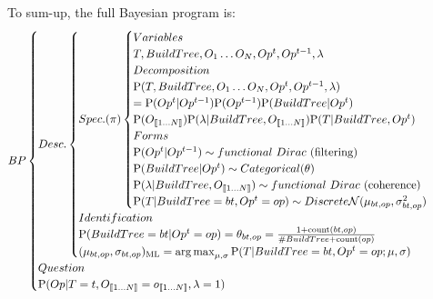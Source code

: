 To sum-up, the full Bayesian program is:
\begin{eqnarray*}
BP
\begin{cases}
Desc.
    \begin{cases}
    Spec. (\pi)
        \begin{cases}
        Variables\\
    T, BuildTree, O_1 \dots O_N, Op^t, Op^{t-1}, \lambda \\ 
        Decomposition\\
            \mathrm{P}(T, BuildTree, O_1 \dots O_N, Op^t, Op^{t-1}, \lambda) \\ 
        =   \mathrm{P}(Op^t | Op^{t-1}) \mathrm{P}(Op^{t-1}) \mathrm{P}(BuildTree | Op^t) \\
            \mathrm{P}(O_{\llbracket 1 \dots N\rrbracket}) \mathrm{P}(\lambda | BuildTree, O_{\llbracket 1 \dots N\rrbracket}) \mathrm{P}(T | BuildTree, Op^t) \\
        Forms\\
            \mathrm{P}(Op^t | Op^{t-1})\sim functional\ Dirac\ \mathrm{(filtering)}\\
            \mathrm{P}(BuildTree | Op^t)\sim Categorical(\theta)\\
            \mathrm{P}(\lambda | BuildTree, O_{\llbracket 1 \dots N\rrbracket})\sim functional\ Dirac\ \mathrm{(coherence)}\\ 
            \mathrm{P}(T | BuildTree=bt, Op^t=op) \sim Discrete\mathcal{N}(\mu_{bt,op},\sigma^2_{bt,op})\\
        \end{cases}\\
    Identification\\
            \mathrm{P}(BuildTree=bt | Op^t=op) = \theta_{bt,op} = \frac{1 + \mathrm{count}(bt,op)}{\#BuildTree + \mathrm{count}(op)}\\
            (\mu_{bt,op},\sigma_{bt,op})_{\mathrm{ML}} = \operatorname*{arg\,max}_{\mu,\sigma}\mathrm{P}(T|BuildTree=bt, Op^t=op; \mu,\sigma)\\
    \end{cases}\\
Question \\
 \mathrm{P}(Op|T=t, O_{\llbracket 1\dots N\rrbracket}=o_{\llbracket 1\dots N\rrbracket}, \lambda = 1) \\
\end{cases}
\end{eqnarray*}


